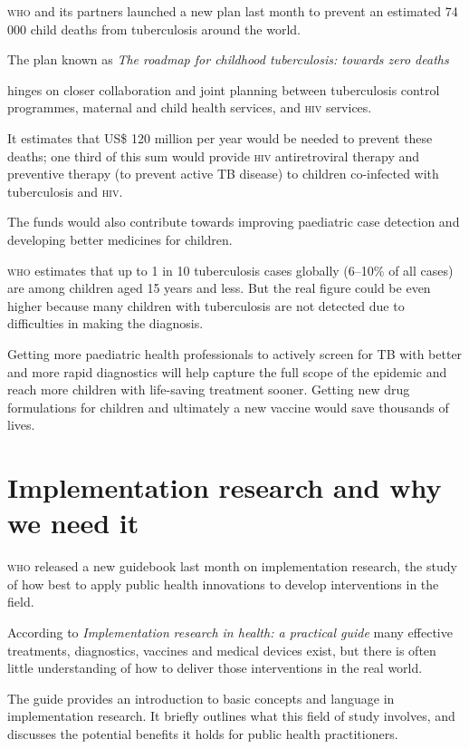 \documentclass{article}
\begin{document}
\textsc{who} and its partners launched a new plan last month to prevent an estimated 74
000 child
deaths from tuberculosis around the world.

The plan known as \textit{The roadmap for childhood tuberculosis: towards zero
deaths}

hinges on closer collaboration and joint planning between tuberculosis control
programmes, maternal
and child health services, and \textsc{hiv} services.

It estimates that US\$ 120 million per year would be needed to prevent these
deaths;
one third of this sum would provide \textsc{hiv} antiretroviral therapy and preventive
therapy (to prevent
active TB disease) to children co-infected with tuberculosis and \textsc{hiv}.

The funds would also contribute towards improving paediatric case detection and
developing better
medicines for children.

\textsc{who} estimates that up to 1 in 10 tuberculosis cases globally (6–10\% of all
cases)
are among children aged 15 years and less. But the real figure could be even
higher because
many children with tuberculosis are not detected due to difficulties in making
the diagnosis.

Getting more paediatric health professionals to actively screen for TB with
better and more rapid
diagnostics will help capture the full scope of the epidemic and reach more
children with
life-saving treatment sooner. Getting new drug formulations for children and
ultimately a new
vaccine would save thousands of lives.

\section{Implementation research and why we need it}

\textsc{who} released a new guidebook last month on implementation research, the study of
how best to
apply public health innovations to develop interventions in the field.

According to \textit{Implementation}
\textit{research in health: a practical guide}
many effective treatments, diagnostics,
vaccines and medical devices exist, but there is often little understanding of
how to deliver those
interventions in the real world.

The guide provides an introduction to basic concepts and language in
implementation research. It
briefly outlines what this field of study involves, and discusses the potential
benefits it holds
for public health practitioners.
\end{document}
